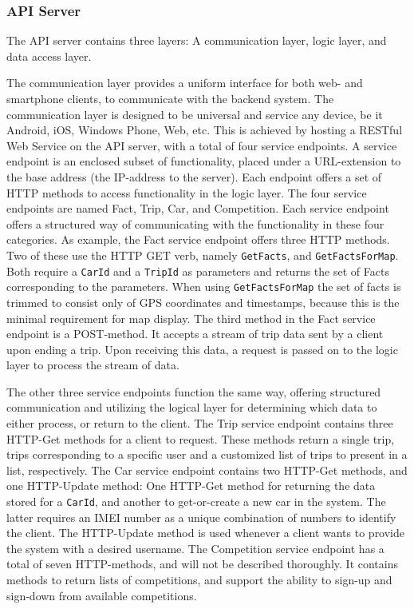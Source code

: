 \subsubsection{API Server}\label{sec:api_server}
The API server contains three layers: A communication layer, logic layer, and data access layer.

The communication layer provides a uniform interface for both web- and smartphone clients, to communicate with the backend system. The communication layer is designed to be universal and service any device, be it Android, iOS, Windows Phone, Web, etc. This is achieved by hosting a RESTful Web Service on the API server, with a total of four service endpoints. A service endpoint is an enclosed subset of functionality, placed under a URL-extension to the base address (the IP-address to the server). Each endpoint offers a set of HTTP methods to access functionality in the logic layer. The four service endpoints are named Fact, Trip, Car, and Competition. Each service endpoint offers a structured way of communicating with the functionality in these four categories. As example, the Fact service endpoint offers three HTTP methods. Two of these use the HTTP GET verb, namely \texttt{GetFacts}, and \texttt{GetFactsForMap}. Both require a \texttt{CarId} and a \texttt{TripId} as parameters and returns the set of Facts corresponding to the parameters. When using \texttt{GetFactsForMap} the set of facts is trimmed to consist only of GPS coordinates and timestamps, because this is the minimal requirement for map display. The third method in the Fact service endpoint is a POST-method. It accepts a stream of trip data sent by a client upon ending a trip. Upon receiving this data, a request is passed on to the logic layer to process the stream of data.

The other three service endpoints function the same way, offering structured communication and utilizing the logical layer for determining which data to either process, or return to the client. The Trip service endpoint contains three HTTP-Get methods for a client to request. These methods return a single trip, trips corresponding to a specific user and a customized list of trips to present in a list, respectively. The Car service endpoint contains two HTTP-Get methods, and one HTTP-Update method: One HTTP-Get method for returning the data stored for a \texttt{CarId}, and another to get-or-create a new car in the system. The latter requires an IMEI number as a unique combination of numbers to identify the client. The HTTP-Update method is used whenever a client wants to provide the system with a desired username. The Competition service endpoint has a total of seven HTTP-methods, and will not be described thoroughly. It contains methods to return lists of competitions, and support the ability to sign-up and sign-down from available competitions.

